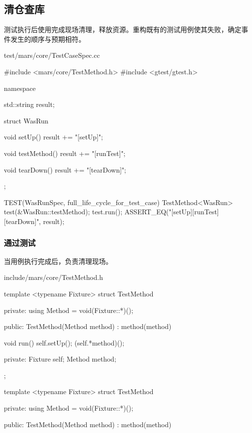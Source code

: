 \begin{content}

\subsection{清仓查库}

测试执行后使用完成现场清理，释放资源。重构既有的测试用例使其失败，确定事件发生的顺序与预期相符。

\begin{nodiff}{test/mars/core/TestCaseSpec.cc}
 \begin{c++}
#include <mars/core/TestMethod.h>
#include <gtest/gtest.h>

namespace {
  std::string result;

  struct WasRun {
    void setUp() {
      result += "[setUp]";
    }

    void testMethod() {
      result += "[runTest]";
    }

    void tearDown() {
      result += "[tearDown]";
    }
  };
}

TEST(WasRunSpec, full_life_cycle_for_test_case) {
  TestMethod<WasRun> test(&WasRun::testMethod);
  test.run();
  ASSERT_EQ("[setUp][runTest][tearDown]", result);
}
\end{c++}
\end{nodiff}

\subsubsection{通过测试}

当用例执行完成后，负责清理现场。

\begin{diff}{include/mars/core/TestMethod.h}
 \begin{minicpp}
template <typename Fixture>
struct TestMethod {
private:
  using Method = void(Fixture::*)();

public:
  TestMethod(Method method)
    : method(method) {}

  void run() {
    self.setUp();
    (self.*method)();
  }

private:
  Fixture self;
  Method method;
};
  \end{minicpp}
\tcblower
 \begin{minicpp}
template <typename Fixture>
struct TestMethod {
private:
  using Method = void(Fixture::*)();

public:
  TestMethod(Method method)
    : method(method) {}

}
\end{minicpp}
\end{diff}
\end{content}
